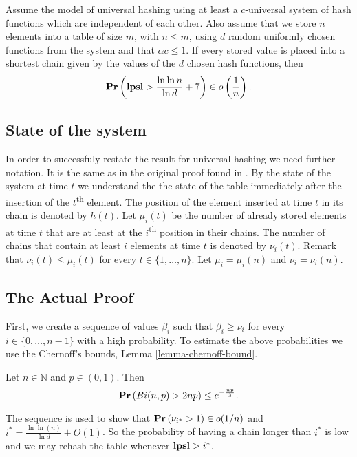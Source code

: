 \begin{theorem}
\label{theorem-universal-hashing-two-choices}
Assume the model of universal hashing using at least a $c$-universal system of hash functions which are independent of each other. Also assume that we store $n$ elements into a table of size $m$, with $n \leq m$, using $d$ random uniformly chosen functions from the system and that $\alpha c \leq 1$. If every stored value is placed into a shortest chain given by the values of the $d$ chosen hash functions, then $$\mathbf{Pr}\left(\mathbf{lpsl} > \frac{\ln \ln n}{\ln d} + 7\right) \in o\left(\frac{1}{n}\right) \textit{.}$$
\end{theorem}

\subsection{State of the system}
In order to successfuly restate the result for universal hashing we need further notation. It is the same as in the original proof found in \cite{1076315}. 
By the state of the system at time $t$ we understand the the state of the table immediately after the insertion of the $t$\textsuperscript{th} element.
The position of the element inserted at time $t$ in its chain is denoted by $h(t)$. Let $\mu_i(t)$ be the number of already stored elements at time $t$ that are at least at the $i$\textsuperscript{th} position in their chains. The number of chains that contain at least $i$ elements at time $t$ is denoted by $\nu_i(t)$. Remark that $\nu_i(t) \leq \mu_i(t)$ for every $t \in \{1, \dots, n \}$. Let $\mu_i = \mu_i(n)$ and $\nu_i = \nu_i(n)$.

\subsection{The Actual Proof}
First, we create a sequence of values $\beta_i$ such that $\beta_i \geq \nu_i$ for every $i \in \{0, \dots, n - 1\}$ with a high probability. To estimate the above probabilities we use the Chernoff's bounds, Lemma \ref{lemma-chernoff-bound}.

\begin{lemma}
\label{lemma-chernoff-bound}
Let $n \in \mathbb{N}$ and $p \in (0, 1)$. Then $$\mathbf{Pr}\left(Bi(n, p) > 2np\right) \leq e ^ {- \frac{np}{3}} \textit{.}$$
\end{lemma}

The sequence is used to show that $\mathbf{Pr}\left(\nu_{i^{*}} > 1\right) \in o(1/n)$ and $i^* = \frac{\ln \ln (n)}{\ln d} + O(1)$. So the probability of having a chain longer than $i^*$ is low and we may rehash the table whenever $\mathbf{lpsl} > i^*$.

